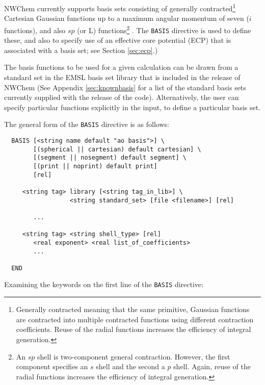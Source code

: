 \label{sec:basis} 

NWChem currently supports basis sets consisting of generally
contracted\footnote{Generally contracted meaning that the same
  primitive, Gaussian functions are contracted into multiple
  contracted functions using different contraction coefficients.
  Reuse of the radial functions increases the efficiency of integral
  generation.} Cartesian Gaussian functions up to a maximum angular
momentum of seven ($i$ functions), and also $sp$ (or L)
functions\footnote{An $sp$ shell is two-component general contraction.
  However, the first component specifies an $s$ shell and the second a
  $p$ shell.  Again, reuse of the radial functions increases the efficiency
  of integral generation.} .  The {\tt BASIS} directive is used to
define these, and also to specify use of an effective core potential
(ECP) that is associated with a basis set; see Section \ref{sec:ecp}.)

The basis functions to be used for a given calculation can be drawn
from a standard set in the EMSL basis set library that is included in
the release of NWChem  (See Appendix \ref{sec:knownbasis} for a list
of the standard basis sets currently supplied with the release of the
code).  Alternatively, the user can specify particular functions
explicitly in the input, to define a particular basis set.

The general form of the \verb+BASIS+ directive is as follows:

\begin{verbatim}
  BASIS [<string name default "ao basis">] \
        [(spherical || cartesian) default cartesian] \
        [(segment || nosegment) default segment] \
        [(print || noprint) default print]
        [rel]

     <string tag> library [<string tag_in_lib>] \
                  <string standard_set> [file <filename>] [rel]

        ...

     <string tag> <string shell_type> [rel]
        <real exponent> <real list_of_coefficients>
        ...
     
  END
\end{verbatim}    

Examining the keywords on the first line of the \verb+BASIS+ directive:


